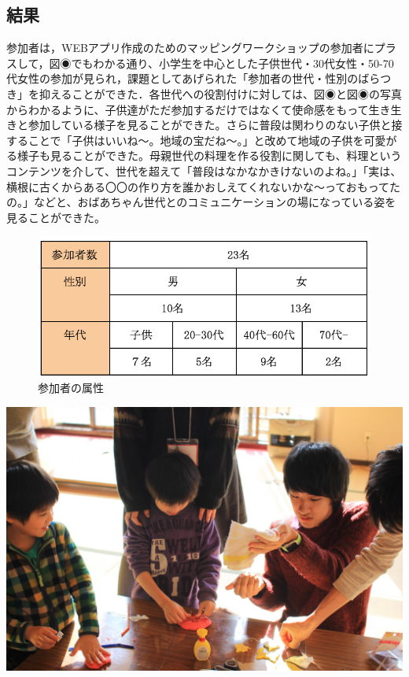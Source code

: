 \documentclass[a4paper]{jsarticle}
\begin{document}
\subsection{結果}
参加者は，WEBアプリ作成のためのマッピングワークショップの参加者にプラスして，図◉でもわかる通り、小学生を中心とした子供世代・30代女性・50-70代女性の参加が見られ，課題としてあげられた「参加者の世代・性別のばらつき」を抑えることができた．各世代への役割付けに対しては、図◉と図◉の写真からわかるように、子供達がただ参加するだけではなくて使命感をもって生き生きと参加している様子を見ることができた。さらに普段は関わりのない子供と接することで「子供はいいね〜。地域の宝だね〜。」と改めて地域の子供を可愛がる様子も見ることができた。母親世代の料理を作る役割に関しても、料理というコンテンツを介して、世代を超えて「普段はなかなかきけないのよね。」「実は、横根に古くからある〇〇の作り方を誰かおしえてくれないかな〜っておもってたの。」などと、おばあちゃん世代とのコミュニケーションの場になっている姿を見ることができた。
\begin{figure}[H]
  \begin{center}
    \includegraphics[width=0.7\hsize]{./images/20.png}
    \caption{参加者の属性}
    \label{fig:tmu_hino}
  \end{center}
\end{figure}
\par
\begin{center}
  \includegraphics[width=0.95\hsize]{./images/IMG_5929.JPG}
  \caption{子供たちによるプレゼント作成の様子}
  \label{chirstmas2}
\end{center}
\end{document}
